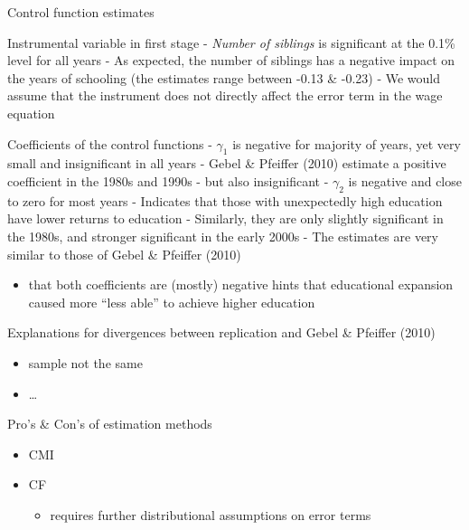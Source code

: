 \documentclass[10pt,ignorenonframetext,]{beamer}
\providecommand{\tightlist}{%
  \setlength{\itemsep}{0pt}\setlength{\parskip}{0pt}}
\begin{document}
\begin{frame}[allowframebreaks]{Control function estimates}
\protect\hypertarget{control-function-estimates}{}

Instrumental variable in first stage - \emph{Number of siblings} is
significant at the 0.1\% level for all years - As expected, the number
of siblings has a negative impact on the years of schooling (the
estimates range between -0.13 \& -0.23) - We would assume that the
instrument does not directly affect the error term in the wage equation

Coefficients of the control functions - \(\gamma_1\) is negative for
majority of years, yet very small and insignificant in all years - Gebel
\& Pfeiffer (2010) estimate a positive coefficient in the 1980s and
1990s - but also insignificant - \(\gamma_2\) is negative and close to
zero for most years - Indicates that those with unexpectedly high
education have lower returns to education - Similarly, they are only
slightly significant in the 1980s, and stronger significant in the early
2000s - The estimates are very similar to those of Gebel \& Pfeiffer
(2010)

\begin{itemize}
\tightlist
\item
  that both coefficients are (mostly) negative hints that educational
  expansion caused more ``less able'' to achieve higher education
\end{itemize}

\end{frame}

\begin{frame}{Explanations for divergences between replication and Gebel
\& Pfeiffer (2010)}
\protect\hypertarget{explanations-for-divergences-between-replication-and-gebel-pfeiffer-2010}{}

\begin{itemize}
\tightlist
\item
  sample not the same
\item
  \ldots{}
\end{itemize}

\end{frame}

\begin{frame}{Pro's \& Con's of estimation methods}
\protect\hypertarget{pros-cons-of-estimation-methods}{}

\begin{itemize}
\item
  CMI
\item
  CF

  \begin{itemize}
  \tightlist
  \item
    requires further distributional assumptions on error terms
  \end{itemize}
\end{itemize}

\end{frame}
\end{document}
